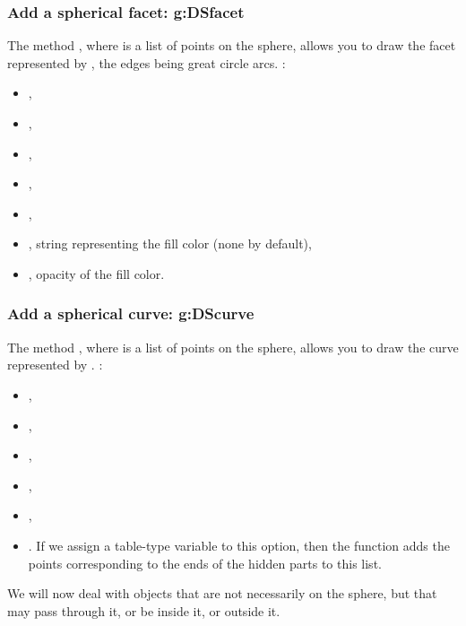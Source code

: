 \subsubsection{Add a spherical facet: g:DSfacet}

The method , where  is a list of points on the sphere, allows you to draw the facet represented by , the edges being great circle arcs. \writeoptions:
\begin{itemize}
    \item {},
    \item {},
    \item {},
    \item {},
    \item {},
    \item {}, string representing the fill color (none by default),
    \item {}, opacity of the fill color.
\end{itemize}

\subsubsection{Add a spherical curve: g:DScurve}

The method , where  is a list of points on the sphere, allows you to draw the curve represented by . \writeoptions:
\begin{itemize}
    \item {},
    \item {},
    \item {},
    \item {},
    \item {},
    \item {}. If we assign a table-type variable to this  option, then the function adds the points corresponding to the ends of the hidden parts to this list.
\end{itemize}

We will now deal with objects that are not necessarily on the sphere, but that may pass through it, or be inside it, or outside it.

